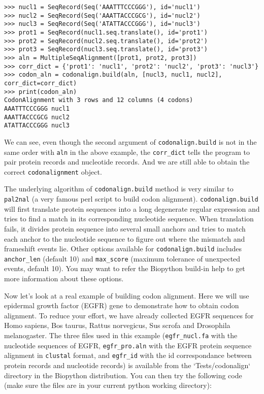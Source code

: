\documentclass{article}
\begin{document}
\begin{verbatim}
>>> nucl1 = SeqRecord(Seq('AAATTTCCCGGG'), id='nucl1')
>>> nucl2 = SeqRecord(Seq('AAATTACCCGCG'), id='nucl2')
>>> nucl3 = SeqRecord(Seq('ATATTACCCGGG'), id='nucl3')
>>> prot1 = SeqRecord(nucl1.seq.translate(), id='prot1')
>>> prot2 = SeqRecord(nucl2.seq.translate(), id='prot2')
>>> prot3 = SeqRecord(nucl3.seq.translate(), id='prot3')
>>> aln = MultipleSeqAlignment([prot1, prot2, prot3])
>>> corr_dict = {'prot1': 'nucl1', 'prot2': 'nucl2', 'prot3': 'nucl3'}
>>> codon_aln = codonalign.build(aln, [nucl3, nucl1, nucl2], corr_dict=corr_dict)
>>> print(codon_aln)
CodonAlignment with 3 rows and 12 columns (4 codons)
AAATTTCCCGGG nucl1
AAATTACCCGCG nucl2
ATATTACCCGGG nucl3
\end{verbatim}

We can see, even though the second argument of \texttt{codonalign.build}
is not in the same order with \texttt{aln} in the above example, the
\texttt{corr\_dict} tells the program to pair protein records and
nucleotide records. And we are still able to obtain the correct
\texttt{codonalignment} object.

The underlying algorithm of \texttt{codonalign.build} method is very
similar to \texttt{pal2nal} (a very famous perl script to build codon
alignment). \texttt{codonalign.build} will first translate protein
sequences into a long degenerate regular expression and tries to find a
match in its corresponding nucleotide sequence. When translation fails,
it divides protein sequence into several small anchors and tries to match
each anchor to the nucleotide sequence to figure out where the mismatch
and frameshift events lie. Other options available for
\texttt{codonalign.build} includes \texttt{anchor\_len} (default 10) and
\texttt{max\_score} (maximum tolerance of unexpected events, default
10). You may want to refer the Biopython build-in help to get more
information about these options.

Now let's look at a real example of building codon alignment. Here we
will use epidermal growth factor (EGFR) gene to demonstrate how to
obtain codon alignment. To reduce your effort, we have already collected
EGFR sequences for Homo sapiens, Bos taurus, Rattus norvegicus,
Sus scrofa and Drosophila melanogaster. The three files used in this example
(\texttt{egfr\_nucl.fa} with the nucleotide sequences of EGFR,
\texttt{egfr\_pro.aln} with the EGFR protein sequence alignment in
\texttt{clustal} format, and \texttt{egfr\_id} with the id correspondance between protein records and nucleotide records) is available from the `Tests/codonalign` directory in the Biopython distribution.
You can then try the following code (make sure the files are in
your current python working directory):
\end{document}

